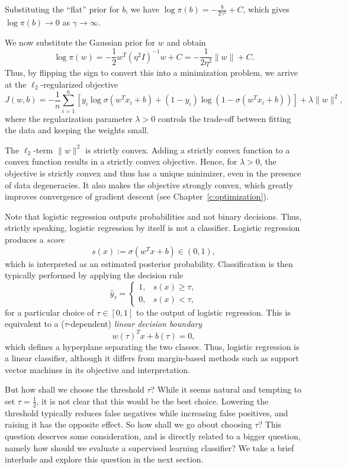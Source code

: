 Substituting the ``flat'' prior for $b$, we have
$\log \pi(b) = - \frac{b}{2\gamma^2} + C$, which  gives $\log \pi(b) \to 0$ as $\gamma \to \infty$.

We now substitute the Gaussian prior for $w$ and obtain
$$\log \pi(w) = - \frac{1}{2} w^T (\eta^2 I)^{-1} w +C = -\frac{1}{2\eta^2} \|w\| +C.$$
Thus, by flipping the sign to convert this into a minimization problem, we arrive at the $\ell_2$-regularized objective
$$J(w, b) =-\frac{1}{n} \sum_{i=1}^n \left[ y_i \log \sigma(w^T x_i +b) + (1-y_i) \log(1-\sigma(w^T x_i +b)) \right] + \lambda \|w\|^2,$$
where the regularization parameter $\lambda > 0$ controls the trade-off between fitting the data and keeping the weights small.



The $\ell_2$-term $\|w\|^2$ is strictly convex. Adding a strictly convex function to a convex function results in a strictly convex objective. Hence, for $\lambda>0$, the objective is strictly convex and thus has a unique minimizer, even in the presence of data degeneracies. It also makes the objective strongly convex, which greatly improves convergence of gradient descent (see Chapter~\ref{c:optimization}).

Note that logistic regression outputs probabilities and not binary decisions. Thus, strictly speaking, logistic regression by itself is not a classifier.  
Logistic regression produces a {\em score}
$$
s(x) := \sigma(w^T x + b) \in (0,1),
$$
which is interpreted as an estimated posterior probability.
Classification is then typically performed by applying the decision rule
$$
\hat y_\tau =
\begin{cases}
1, & s(x) \ge \tau,\\
0, & s(x) < \tau,
\end{cases}
$$
for a particular choice of $\tau \in [0,1]$
to the output of logistic regression.
This is equivalent to a ($\tau$-dependent) {\em linear decision boundary}
$$
w(\tau)^T x + b(\tau) = 0,
$$
which defines a hyperplane separating the two classes. Thus, logistic regression is a linear classifier, although it differs from margin-based methods such as support vector machines in its objective and interpretation.

But how shall we choose the threshold $\tau$? While it seems natural and tempting to set $\tau = \frac{1}{2}$, it is not clear that this would be the best choice. Lowering the threshold typically reduces false negatives while increasing false positives, and raising it has the opposite effect. So how shall we go about choosing $\tau$? This question deserves some consideration, and is directly related to a bigger question, namely how should we evaluate a supervised learning classifier? We take a brief interlude and explore this question in the next section.


